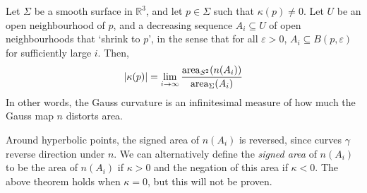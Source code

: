 \documentclass[a4paper]{article}
\begin{document}
\begin{theorem}
	Let \( \Sigma \) be a smooth surface in \( \mathbb R^3 \), and let \( p \in \Sigma \) such that \( \kappa(p) \neq 0 \).
	Let \( U \) be an open neighbourhood of \( p \), and a decreasing sequence \( A_i \subseteq U \) of open neighbourhoods that `shrink to \( p \)', in the sense that for all \( \varepsilon > 0 \), \( A_i \subseteq B(p,\varepsilon) \) for sufficiently large \( i \).
	Then,
	\[
		\abs{\kappa(p)} = \lim_{i \to \infty} \frac{\mathrm{area}_{S^2} (n(A_i))}{\mathrm{area}_{\Sigma} (A_i)}
	\]
	In other words, the Gauss curvature is an infinitesimal measure of how much the Gauss map \( n \) distorts area.
\end{theorem}
\begin{remark}
	Around hyperbolic points, the signed area of \( n(A_i) \) is reversed, since curves \( \gamma \) reverse direction under \( n \).
	We can alternatively define the \textit{signed area} of \( n(A_i) \) to be the area of \( n(A_i) \) if \( \kappa > 0 \) and the negation of this area if \( \kappa < 0 \).
	The above theorem holds when \( \kappa = 0 \), but this will not be proven.
\end{remark}
\end{document}
